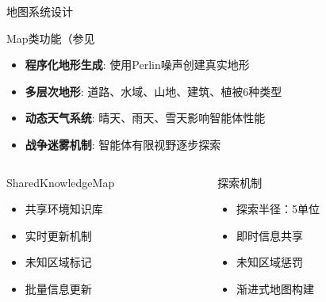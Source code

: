 \documentclass[
10pt,
aspectratio=169,
]{beamer}
\begin{document}
\begin{frame}{地图系统设计}
    \begin{block}{Map类功能（参见}%
        \begin{itemize}
            \item \textbf{程序化地形生成}: 使用Perlin噪声创建真实地形
            \item \textbf{多层次地形}: 道路、水域、山地、建筑、植被6种类型
            \item \textbf{动态天气系统}: 晴天、雨天、雪天影响智能体性能
            \item \textbf{战争迷雾机制}: 智能体有限视野逐步探索
        \end{itemize}
    \end{block}
    
    \begin{columns}
        \begin{column}{0.5\textwidth}
            \begin{exampleblock}{SharedKnowledgeMap}
                \begin{itemize}
                    \item 共享环境知识库
                    \item 实时更新机制
                    \item 未知区域标记
                    \item 批量信息更新
                \end{itemize}
            \end{exampleblock}
        \end{column}
        \begin{column}{0.5\textwidth}
            \begin{alertblock}{探索机制}
                \begin{itemize}
                    \item 探索半径：5单位
                    \item 即时信息共享
                    \item 未知区域惩罚
                    \item 渐进式地图构建
                \end{itemize}
            \end{alertblock}
        \end{column}
    \end{columns}
\end{frame}

\end{document}
